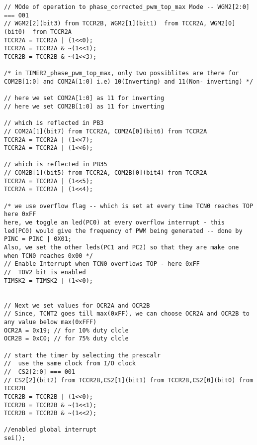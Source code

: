 \documentclass{article}
\begin{document}
\begin{verbatim}
// MOde of operation to phase_corrected_pwm_top_max Mode -- WGM2[2:0] === 001
// WGM2[2](bit3) from TCCR2B, WGM2[1](bit1)  from TCCR2A, WGM2[0](bit0)  from TCCR2A
TCCR2A = TCCR2A | (1<<0);
TCCR2A = TCCR2A & ~(1<<1);
TCCR2B = TCCR2B & ~(1<<3);	

/* in TIMER2_phase_pwm_top_max, only two possiblites are there for COM2B[1:0] and COM2A[1:0] i.e) 10(Inverting) and 11(Non- inverting) */

// here we set COM2A[1:0] as 11 for inverting
// here we set COM2B[1:0] as 11 for inverting

// which is reflected in PB3
// COM2A[1](bit7) from TCCR2A, COM2A[0](bit6) from TCCR2A
TCCR2A = TCCR2A | (1<<7);
TCCR2A = TCCR2A | (1<<6);

// which is reflected in PB35
// COM2B[1](bit5) from TCCR2A, COM2B[0](bit4) from TCCR2A
TCCR2A = TCCR2A | (1<<5);
TCCR2A = TCCR2A | (1<<4);

/* we use overflow flag -- which is set at every time TCN0 reaches TOP here 0xFF
here, we toggle an led(PC0) at every overflow interrupt - this led(PC0) would give the frequency of PWM being generated -- done by PINC = PINC | 0X01;
Also, we set the other leds(PC1 and PC2) so that they are make one when TCN0 reaches 0x00 */
// Enable Interrupt when TCN0 overflows TOP - here 0xFF
//  TOV2 bit is enabled
TIMSK2 = TIMSK2 | (1<<0);


// Next we set values for OCR2A and OCR2B
// Since, TCNT2 goes till max(0xFF), we can choose OCR2A and OCR2B to any value below max(0xFFF)
OCR2A = 0x19; // for 10% duty clcle
OCR2B = 0xC0; // for 75% duty clcle

// start the timer by selecting the prescalr
//  use the same clock from I/O clock
//  CS2[2:0] === 001
// CS2[2](bit2) from TCCR2B,CS2[1](bit1) from TCCR2B,CS2[0](bit0) from TCCR2B
TCCR2B = TCCR2B | (1<<0);
TCCR2B = TCCR2B & ~(1<<1);
TCCR2B = TCCR2B & ~(1<<2);

//enabled global interrupt
sei();
\end{verbatim}
\end{document}
